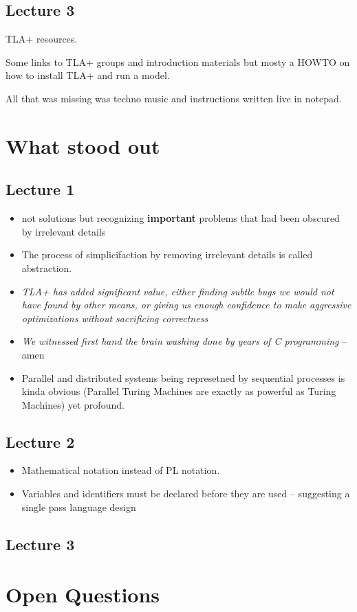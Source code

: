 \documentclass[11pt]{article}
\begin{document}
\subsection*{Lecture 3}

TLA+ resources.

Some links to TLA+ groups and introduction materials but mosty a HOWTO on how to install TLA+ and run a model. 

All that was missing was techno music and instructions written live in notepad.

\section*{What stood out}

\subsection{Lecture 1}

\begin{itemize}
  \item [$\ldots$] not solutions but recognizing \textbf{important} problems that had been
  obscured by irrelevant details
  \item The process of simplicifaction by removing irrelevant details is called abstraction.
  \item {
    \textit{TLA+ has added signiﬁcant value, either ﬁnding subtle bugs we would not
    have found by other means, or giving us enough conﬁdence to make aggressive
    optimizations without sacriﬁcing correctness}
  }
  \item {
    \textit{We witnessed ﬁrst hand the brain washing done by years of C
    programming}
    -- amen
  }
  \item {
    Parallel and distributed systems being represetned by sequential processes
    is kinda obvious (Parallel Turing Machines are exactly as powerful as Turing
    Machines) yet profound.
  }
\end{itemize}

\subsection{Lecture 2}

\begin{itemize}
  \item { Mathematical notation instead of PL notation. }
  \item { Variables and identifiers must be declared before they are used --
  suggesting a single pass language design }
\end{itemize}

\subsection{Lecture 3}

\section*{Open Questions}
\end{document}
